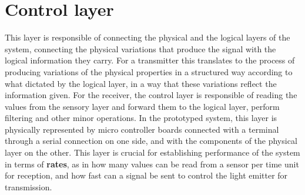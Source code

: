 \section{Control layer}


This layer is responsible of connecting the physical and the logical layers of the system, connecting the physical variations that produce the signal with the logical information they carry.
For a transmitter this translates to the process of producing variations of the physical properties in a structured way according to what dictated by the logical layer, in a way that these variations reflect the information given.
For the receiver, the control layer is responsible of reading the values from the sensory layer and forward them to the logical layer, perform filtering and other minor operations.
In the prototyped system, this layer is physically represented by micro controller boards connected with a terminal through a serial connection on one side, and with the components of the physical layer on the other.
This layer is crucial for establishing performance of the system in terms of \textbf{rates}, as in how many values can be read from a sensor per time unit for reception, and how fast can a signal be sent to control the light emitter for transmission.

